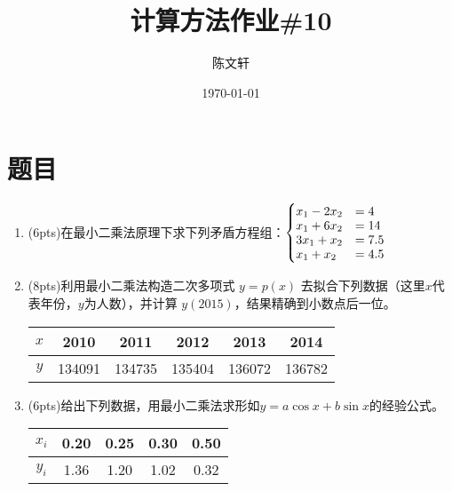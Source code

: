 \documentclass[cn,hazy,green,11pt,normal]{elegantnote}
\title{计算方法作业\#10}
\author{陈文轩}
\institute{KFRC}
\date{\today}
\begin{document}
\maketitle

\section{题目}

    \begin{enumerate}

    \item (6pts)在最小二乘法原理下求下列矛盾方程组：$\begin{cases}x_1-2x_2&=4\vspace{-0.1cm}\\x_1+6x_2&=14\vspace{-0.1cm}\\3x_1+x_2&=7.5\vspace{-0.1cm}\\x_1+x_2&=4.5\end{cases}$

    \item (8pts)利用最小二乘法构造二次多项式 $y=p(x)$ 去拟合下列数据（这里$x$代表年份，$y$为人数），并计算 $y(2015)$，结果精确到小数点后一位。

        \begin{table}[H]
            \centering
            \begin{tabular}{|c|c|c|c|c|c|}
                \hline
                $x$ & 2010 & 2011 & 2012 & 2013 & 2014 \\
                \hline
                $y$ & 134091 & 134735 & 135404 & 136072 & 136782 \\
                \hline
            \end{tabular}
            \label{tab:1}
        \end{table}


    \item (6pts)给出下列数据，用最小二乘法求形如$y=a\cos x+b\sin x$的经验公式。

        \begin{table}[H]
            \centering
            \begin{tabular}{|c|c|c|c|c|}
                \hline
                $x_i$ & 0.20 & 0.25 & 0.30 & 0.50 \\
                \hline
                $y_i$ & 1.36 & 1.20 & 1.02 & 0.32 \\
                \hline
            \end{tabular}
            \label{tab:2}
        \end{table}



\end{enumerate}
\end{document}
